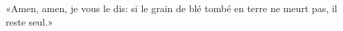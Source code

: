 \encetemps \jesusdisciples
	«Amen, amen, je vous le dis:
	si le grain de blé tombé en terre ne meurt pas, il reste seul.»
